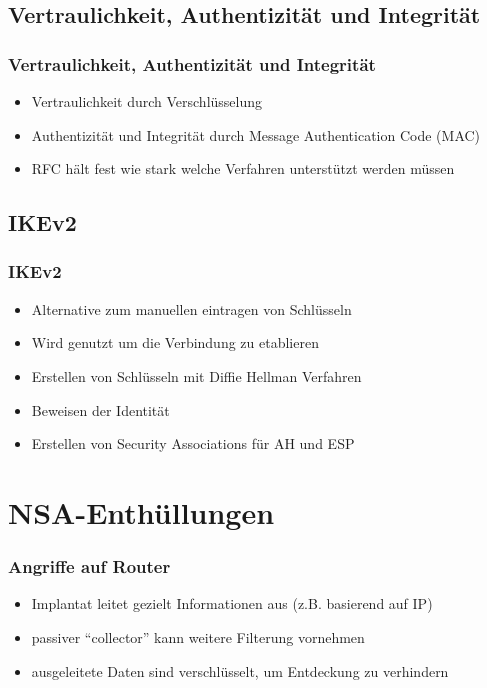 \documentclass[t]{beamer}
\begin{document}
\subsection*{Vertraulichkeit, Authentizität und Integrität}
\begin{frame}
	\frametitle{Vertraulichkeit, Authentizität und Integrität}
	\begin{itemize}
		\vfill
		\item Vertraulichkeit durch Verschlüsselung
		\vfill
		\item Authentizität und Integrität durch Message Authentication Code (MAC)
		\vfill
		\item RFC hält fest wie stark welche Verfahren unterstützt werden müssen
		\vfill
	\end{itemize}
\end{frame}

\subsection*{IKEv2}
\begin{frame}
	\frametitle{IKEv2}
	\begin{itemize}
		\vfill
		\item Alternative zum manuellen eintragen von Schlüsseln
		\vfill
		\item Wird genutzt um die Verbindung zu etablieren
		\vfill
		\item Erstellen von Schlüsseln mit Diffie Hellman Verfahren
		\vfill
		\item Beweisen der Identität
		\vfill
		\item Erstellen von Security Associations für AH und ESP
		\vfill
	\end{itemize}
\end{frame}

\section{NSA-Enthüllungen}
\begin{frame}
	\frametitle{Angriffe auf Router}
	\begin{itemize}
		\vfill
		\item Implantat leitet gezielt Informationen aus (z.B. basierend auf IP)
		\vfill
		\item passiver "`collector"' kann weitere Filterung vornehmen
		\vfill
		\item ausgeleitete Daten sind verschlüsselt, um Entdeckung zu verhindern
		\vfill
	\end{itemize}
\end{frame}
\end{document}
